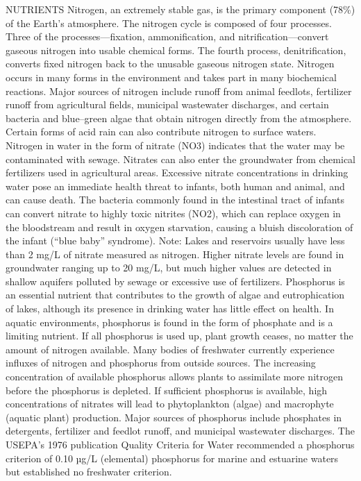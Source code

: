 \documentclass{article}
\begin{document}
NUTRIENTS Nitrogen, an extremely stable gas, is the primary component
(78\%) of the Earth's atmosphere. The nitrogen cycle is composed of four
processes. Three of the processes---fixation, ammonification, and
nitrification---convert gaseous nitrogen into usable chemical forms. The
fourth process, denitrification, converts fixed nitrogen back to the
unusable gaseous nitrogen state. Nitrogen occurs in many forms in the
environment and takes part in many biochemical reactions. Major sources
of nitrogen include runoff from animal feedlots, fertilizer runoff from
agricultural fields, municipal wastewater discharges, and certain
bacteria and blue--green algae that obtain nitrogen directly from the
atmosphere. Certain forms of acid rain can also contribute nitrogen to
surface waters. Nitrogen in water in the form of nitrate (NO3) indicates
that the water may be contaminated with sewage. Nitrates can also enter
the groundwater from chemical fertilizers used in agricultural areas.
Excessive nitrate concentrations in drinking water pose an immediate
health threat to infants, both human and animal, and can cause death.
The bacteria commonly found in the intestinal tract of infants can
convert nitrate to highly toxic nitrites (NO2), which can replace oxygen
in the bloodstream and result in oxygen starvation, causing a bluish
discoloration of the infant (``blue baby'' syndrome). Note: Lakes and
reservoirs usually have less than 2 mg/L of nitrate measured as
nitrogen. Higher nitrate levels are found in groundwater ranging up to
20 mg/L, but much higher values are detected in shallow aquifers
polluted by sewage or excessive use of fertilizers. Phosphorus is an
essential nutrient that contributes to the growth of algae and
eutrophication of lakes, although its presence in drinking water has
little effect on health. In aquatic environments, phosphorus is found in
the form of phosphate and is a limiting nutrient. If all phosphorus is
used up, plant growth ceases, no matter the amount of nitrogen
available. Many bodies of freshwater currently experience influxes of
nitrogen and phosphorus from outside sources. The increasing
concentration of available phosphorus allows plants to assimilate more
nitrogen before the phosphorus is depleted. If sufficient phosphorus is
available, high concentrations of nitrates will lead to phytoplankton
(algae) and macrophyte (aquatic plant) production. Major sources of
phosphorus include phosphates in detergents, fertilizer and feedlot
runoff, and municipal wastewater discharges. The USEPA's 1976
publication Quality Criteria for Water recommended a phosphorus
criterion of 0.10 µg/L (elemental) phosphorus for marine and estuarine
waters but established no freshwater criterion.
\end{document}
